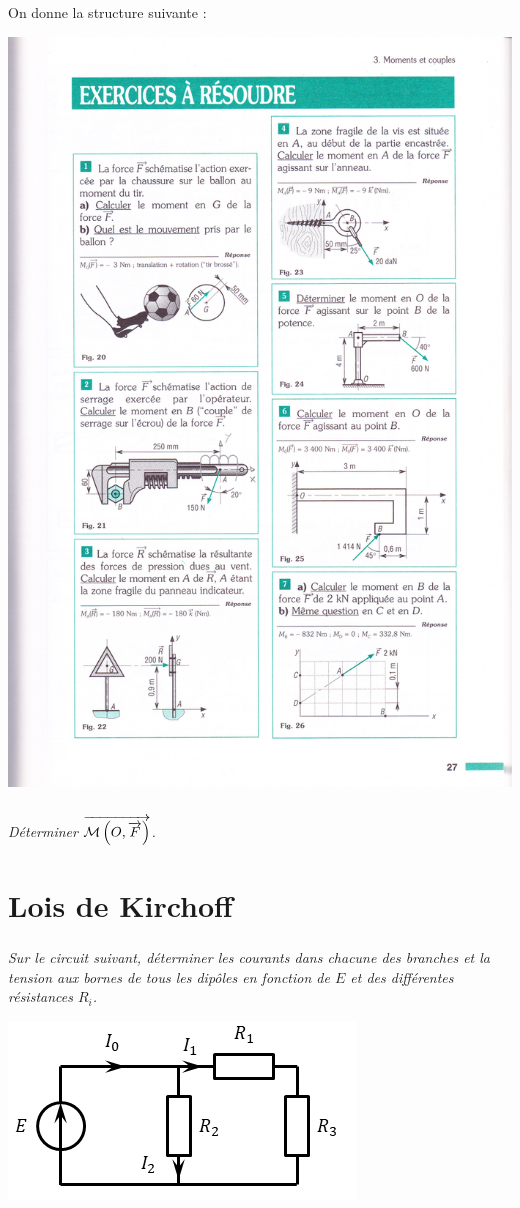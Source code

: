 \documentclass[10pt,fleqn]{article} %
\begin{document}
\begin{multicols}{2}
On donne la structure suivante : 
\begin{center}
\includegraphics[width=.8\linewidth]{images/fig_22}
\end{center}


\subparagraph{}
\textit{Déterminer $\overrightarrow{\mathcal{M}\left(O,\overrightarrow{F} \right)}$.}


\section*{Lois de Kirchoff}
\ifprof
\else
\fi

\subparagraph*{}
\textit{Sur le circuit suivant, déterminer les courants dans chacune des branches et la tension aux bornes de tous les dipôles en fonction de $E$ et des différentes résistances $R_i$.}
\begin{center}
\includegraphics[width=\linewidth]{images/fig_01}
\end{center}



\end{multicols}
\end{document}
